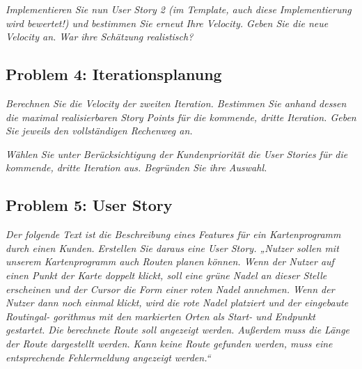 \documentclass[
  ngerman,
  DIV=14
]{scrartcl}
\begin{document}
\medskip\noindent
\emph{Implementieren Sie nun User Story 2 (im Template, auch diese Implementierung wird bewertet!) und bestimmen Sie erneut Ihre Velocity. Geben Sie die neue Velocity an. War ihre Schätzung realistisch?}

\subsection*{Problem 4: Iterationsplanung}
\emph{Berechnen Sie die Velocity der zweiten Iteration.
Bestimmen Sie anhand dessen die maximal realisierbaren Story Points für die kommende, dritte Iteration. Geben Sie jeweils den vollständigen Rechenweg an.}

\medskip\noindent
\emph{Wählen Sie unter Berücksichtigung der Kundenpriorität die User Stories für die kommende, dritte Iteration aus. Begründen Sie ihre Auswahl.}

\subsection*{Problem 5: User Story}
\emph{Der folgende Text ist die Beschreibung eines Features für ein Kartenprogramm durch einen Kunden. Erstellen Sie daraus eine User Story.
„Nutzer sollen mit unserem Kartenprogramm auch Routen planen können. Wenn der Nutzer auf einen Punkt der Karte doppelt klickt, soll eine grüne Nadel an dieser Stelle erscheinen und der Cursor die Form einer roten Nadel annehmen. Wenn der Nutzer dann noch einmal klickt, wird die rote Nadel platziert und der eingebaute Routingal- gorithmus mit den markierten Orten als Start- und Endpunkt gestartet. Die berechnete Route soll angezeigt werden. Außerdem muss die Länge der Route dargestellt werden. Kann keine Route gefunden werden, muss eine entsprechende Fehlermeldung angezeigt werden.“}
\end{document}
